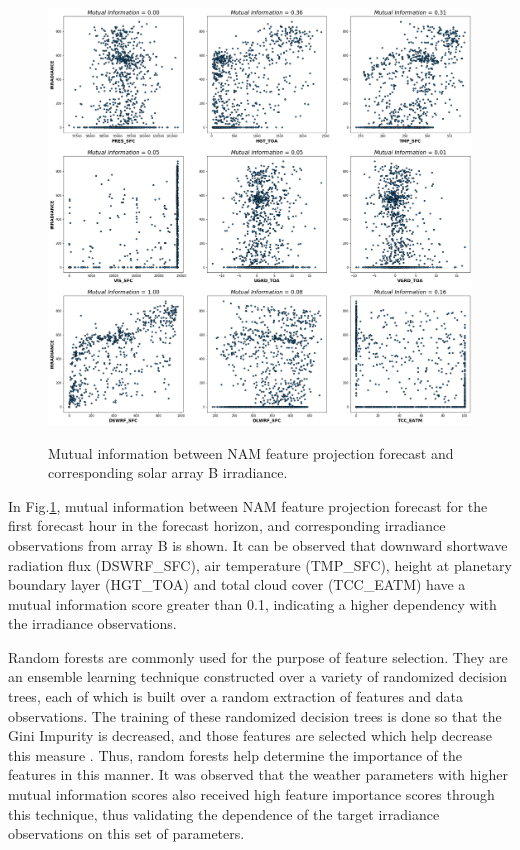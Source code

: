 \begin{figure}[htbp]
    \begin{center}
    	\includegraphics[width=\textwidth]{chapter3/fig_mi_ugabpoa1irr.png}
    	\label{fig:fig_mi_forecast_target_hr1}
    	\caption[Mutual information between NAM feature projection forecast and corresponding solar array B irradiance]{Mutual information between NAM feature projection forecast and corresponding solar array B irradiance.}
    \end{center}
\end{figure}

In Fig.\ref{fig:fig_mi_forecast_target_hr1}, mutual information between NAM feature projection forecast for the first forecast hour in the forecast horizon, and corresponding irradiance observations from array B is shown. It can be observed that downward shortwave radiation flux (DSWRF\_SFC), air temperature (TMP\_SFC), height at planetary boundary layer (HGT\_TOA) and total cloud cover (TCC\_EATM) have a mutual information score greater than 0.1, indicating a higher dependency with the irradiance observations. 

\par Random forests are commonly used for the purpose of feature selection. They are an ensemble learning technique constructed over a variety of randomized decision trees, each of which is built over a random extraction of features and data observations. The training of these randomized decision trees is done so that the Gini Impurity is decreased, and those features are selected which help decrease this measure \cite{feature_selection_rf}. Thus, random forests help determine the importance of the features in this manner. It was observed that the weather parameters with higher mutual information scores also received high feature importance scores through this technique, thus validating the dependence of the target irradiance observations on this set of parameters.

